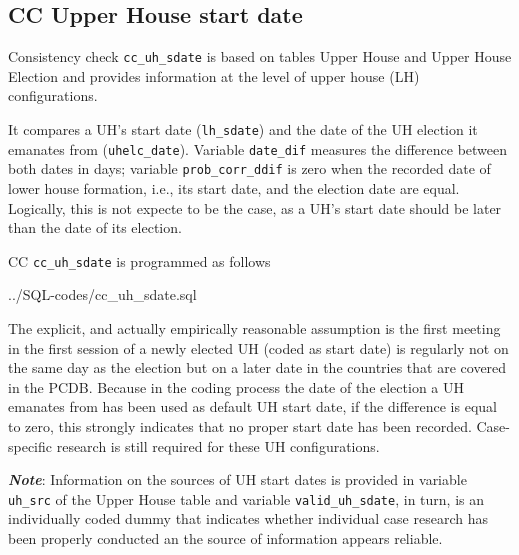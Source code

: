 \subsection{CC Upper House start date}
Consistency check \texttt{\footnotesize cc\_uh\_sdate} is based on tables Upper House and Upper House Election and provides information at the level of upper house (LH) configurations.

It compares a UH's start date (\texttt{\footnotesize lh\_sdate}) and the date of the UH election it emanates from (\texttt{\footnotesize uhelc\_date}). Variable \texttt{\footnotesize date\_dif} measures the difference between both dates in days; variable \texttt{\footnotesize prob\_corr\_ddif} is zero when the recorded date of lower house formation, i.e., its start date, and the election date are equal. 
Logically, this is not expecte to be the case, as a UH's start date should be later than the date of its election.

CC \texttt{\footnotesize cc\_uh\_sdate} is programmed as follows

%
{../SQL-codes/cc_uh_sdate.sql}

The explicit, and actually empirically reasonable assumption is the first meeting in the first session of a newly elected UH (coded as start date) is regularly not on the same day as the election but on a later date in the countries that are covered in the PCDB. 
Because in the coding process the date of the election a UH emanates from has been used as default UH start date, if the difference is equal to zero, this strongly indicates that no proper start date has been recorded. Case-specific research is still required for these UH configurations.

\emph{\textbf{Note}}: Information on the sources of UH start dates is provided in variable \texttt{\footnotesize uh\_src} of the Upper House table and variable \texttt{\footnotesize valid\_uh\_sdate}, in turn, is an individually coded dummy that indicates whether individual case research has been properly conducted an the source of information appears reliable.
